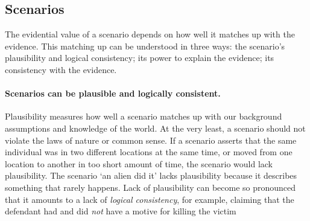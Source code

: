 \documentclass[10pt]{article}
\begin{document}

\subsection{Scenarios}

The evidential value of a scenario depends on how well it matches up with the evidence. 
This matching up can be understood in three ways: the scenario's plausibility and logical consistency; its power to explain the evidence; 
its consistency with the evidence. 


\paragraph{Scenarios can be plausible and logically consistent.}

Plausibility measures how well a scenario matches up with 
our background assumptions and knowledge of the world. %
At the very least, a scenario should not violate the laws of nature or common sense. If a scenario asserts that the same individual was in two different locations 
at the same time, or moved from one location to another in too short amount of time, the scenario would lack plausibility. 
The scenario `an alien did it' lacks plausibility because it describes something that rarely happens. 
Lack of plausibility can become so pronounced that it amounts to a lack of \textit{logical consistency}, for example, claiming that 
 the defendant had and did \textit{not} have a motive for killing the victim
 
\end{document}
